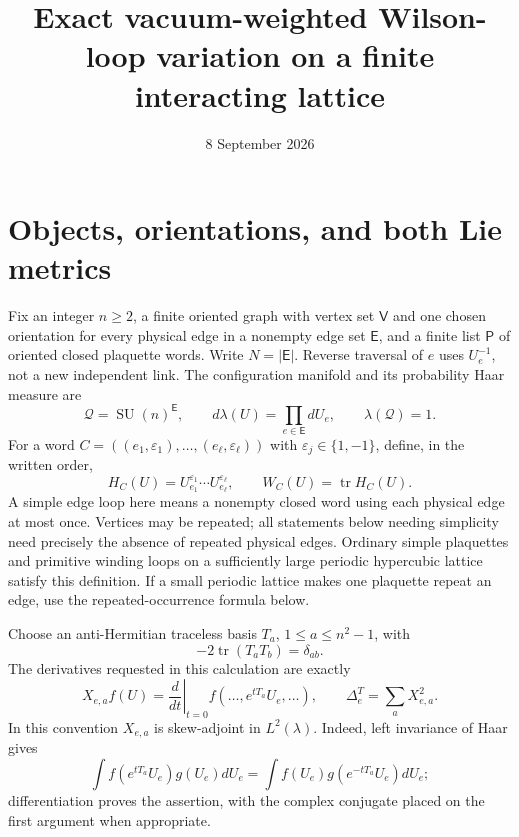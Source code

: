 \documentclass[11pt]{article}
\title{Exact vacuum-weighted Wilson-loop variation on a finite interacting lattice}
\author{}
\date{8 September 2026}
\theoremstyle{definition}
\newcommand{\tr}{\operatorname{tr}}
\newcommand{\SU}{\operatorname{SU}}
\begin{document}
\maketitle

\section{Objects, orientations, and both Lie metrics}

Fix an integer $n\geq2$, a finite oriented graph with vertex set $\mathsf V$
and one chosen orientation for every physical edge in a nonempty edge set
$\mathsf E$, and a finite list $\mathsf P$ of oriented closed plaquette words.
Write $N=|\mathsf E|$. Reverse traversal of $e$ uses $U_e^{-1}$, not a new
independent link. The configuration manifold and its probability Haar measure
are
\[
 \mathcal Q=\SU(n)^{\mathsf E},\qquad
 d\lambda(U)=\prod_{e\in\mathsf E}dU_e,\qquad \lambda(\mathcal Q)=1.
\]
For a word $C=((e_1,\varepsilon_1),\ldots,(e_\ell,\varepsilon_\ell))$
with $\varepsilon_j\in\{1,-1\}$, define, in the written order,
\[
 H_C(U)=U_{e_1}^{\varepsilon_1}\cdots U_{e_\ell}^{\varepsilon_\ell},
 \qquad W_C(U)=\tr H_C(U).
\]
A simple edge loop here means a nonempty closed word using each physical edge
at most once. Vertices may be repeated; all statements below needing simplicity
need precisely the absence of repeated physical edges. Ordinary simple
plaquettes and primitive winding loops on a sufficiently large periodic
hypercubic lattice satisfy this definition. If a small periodic lattice makes
one plaquette repeat an edge, use the repeated-occurrence formula below.

Choose an anti-Hermitian traceless basis $T_a$, $1\leq a\leq n^2-1$, with
\[
 -2\tr(T_aT_b)=\delta_{ab}.
\]
The derivatives requested in this calculation are exactly
\[
 X_{e,a}f(U)=\left.\frac d{dt}\right|_{t=0}
 f(\ldots,e^{tT_a}U_e,\ldots),\qquad
 \Delta_e^T=\sum_aX_{e,a}^2.
\]
In this convention $X_{e,a}$ is skew-adjoint in $L^2(\lambda)$. Indeed,
left invariance of Haar gives
\[
 \int f(e^{tT_a}U_e)g(U_e)dU_e
 =\int f(U_e)g(e^{-tT_a}U_e)dU_e;
\]
differentiation proves the assertion,
with the complex conjugate placed on the first argument when appropriate.
\end{document}
